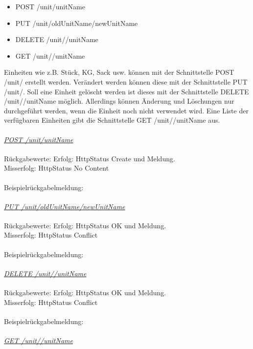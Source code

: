 \begin{itemize}
	\itemsep0pt
	\item  POST /unit/{unitName}
	\item  PUT /unit/{oldUnitName}/{newUnitName}
	\item  DELETE /unit//{unitName}
	\item  GET /unit//{unitName}
\end{itemize}
Einheiten wie z.B. Stück, KG, Sack usw. können mit der Schnittstelle POST /unit/ erstellt werden. Verändert werden können diese mit der Schnittstelle PUT /unit/. Soll eine Einheit gelöscht werden ist dieses mit der Schnittstelle DELETE /unit//{unitName} möglich. Allerdings können Änderung und Löschungen nur durchgeführt werden, wenn die Einheit noch nicht verwendet wird.
Eine Liste der verfügbaren Einheiten gibt die Schnittstelle GET /unit//{unitName} aus.
\\
\\
\textit{\underline{POST /unit/{unitName}}}
\\
\\
Rückgabewerte: \tab 					Erfolg: HttpStatus Create und Meldung.\\
\tab \tab 								Misserfolg: HttpStatus No Content\\
\\
Beispielrückgabelmeldung:	
\\
\\
\textit{\underline{PUT /unit/{oldUnitName}/{newUnitName}}}
\\
\\
Rückgabewerte: \tab 					Erfolg: HttpStatus OK und Meldung.\\
\tab \tab 								Misserfolg: HttpStatus Conflict\\
\\
Beispielrückgabelmeldung:	
\\
\\
\textit{\underline{DELETE /unit//{unitName}}}
\\
\\
Rückgabewerte: \tab 					Erfolg: HttpStatus OK und Meldung.\\
\tab \tab 								Misserfolg: HttpStatus Conflict\\
\\
Beispielrückgabelmeldung:	
\\
\\
\textit{\underline{GET /unit//{unitName}}}
